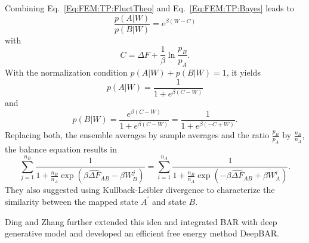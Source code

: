 Combining Eq.~\ref{Eq:FEM:TP:FluctTheo} and Eq.~\ref{Eq:FEM:TP:Bayes} leads to
\begin{equation}
	\frac{p(A|W)}{p(B|W)}=e^{\beta(W-C)}
\end{equation}
with
\begin{equation}
	C=\Delta F+\frac{1}{\beta}\ln{\frac{p_B}{p_A}}.
\end{equation}
With the normalization condition $p(A|W)+p(B|W)=1$, it yields
\begin{equation}
	p(A|W)=\frac{1}{1+e^{\beta(C-W)}}
\end{equation}
and
\begin{equation}
	p(B|W)=\frac{e^{\beta(C-W)}}{1+e^{\beta(C-W)}}=\frac{1}{1+e^{\beta(-C+W)}}.
\end{equation}
Replacing both, the ensemble averages by sample averages and the ratio $\frac{p_B}{p_A}$ by $\frac{n_B}{n_A}$, the balance equation results in
\begin{equation}
	\sum_{j=1}^{n_B}\frac{1}{1+\frac{n_B}{n_A}\exp{\left(\beta\widehat{\Delta F}_{AB}-\beta W^j_B\right)}}=	\sum_{i=1}^{n_A}\frac{1}{1+\frac{n_B}{n_A}\exp{\left(-\beta\widehat{\Delta F}_{AB}+\beta W^i_A\right)}}.
\end{equation}
They also suggested using Kullback-Leibler divergence to characterize the similarity between the mapped state $A^\prime$ and state $B$.

Ding and Zhang further extended this idea and integrated BAR with deep generative model and developed an efficient free energy method DeepBAR.\cite{DingJPCL2021}